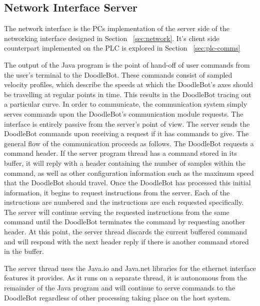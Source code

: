 \subsection{Network Interface Server}
\label{sec:pc-network}
The network interface is the PCs implementation of the server side of the networking interface designed in Section ~\ref{sec:network}. It's client side counterpart implemented on the PLC is explored in Section ~\ref{sec:plc-comms}

The output of the Java program is the point of hand-off of user commands from the user's terminal to the DoodleBot. These commands consist of sampled velocity profiles, which describe the speeds at which the DoodleBot's axes should be travelling at regular points in time. This results in the DoodleBot tracing out a particular curve. In order to communicate, the communication system simply serves commands upon the DoodleBot's communication module requests. The interface is entirely passive from the server's point of view. The server sends the DoodleBot commands upon receiving a request if it has commands to give. The general flow of the communication proceeds as follows. The DoodleBot requests a command header. If the server program thread has a command stored in its buffer, it will reply with a header containing the number of samples within the command, as well as other configuration information such as the maximum speed that the DoodleBot should travel. Once the DoodleBot has processed this initial information, it begins to request instructions from the server. Each of the instructions are numbered and the instructions are each requested specifically. The server will continue serving the requested instructions from the same command until the DoodleBot terminates the command by requesting another header. At this point, the server thread discards the current buffered command and will respond with the next header reply if there is another command stored in the buffer.

The server thread uses the Java.io and Java.net libraries for the ethernet interface features it provides. As it runs on a separate thread, it is autonomous from the remainder of the Java program and will continue to serve commands to the DoodleBot regardless of other processing taking place on the host system.